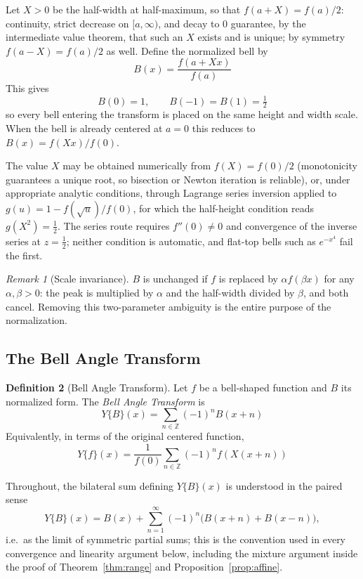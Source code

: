 \documentclass[11pt]{article}
\theoremstyle{definition}
\newtheorem{definition}{Definition}[section]
\theoremstyle{plain}
\theoremstyle{remark}
\newtheorem{remark}[definition]{Remark}
\begin{document}
Let $X>0$ be the half-width at half-maximum, so that $f(a+X)=f(a)/2$: continuity,
strict decrease on $[a,\infty)$, and decay to $0$ guarantee, by the intermediate value
theorem, that such an $X$ exists and is unique; by symmetry
$f(a-X)=f(a)/2$ as well. Define the normalized bell by
\[
\boxed{\;B(x)=\frac{f(a+Xx)}{f(a)}\;}
\]
This gives
\[
\boxed{\;B(0)=1,\qquad B(-1)=B(1)=\tfrac12 \;}
\]
so every bell entering the transform is placed on the same height and width scale. When
the bell is already centered at $a=0$ this reduces to $B(x)=f(Xx)/f(0)$.

The value $X$ may be obtained numerically from $f(X)=f(0)/2$ (monotonicity guarantees
a unique root, so bisection or Newton iteration is reliable), or, under appropriate
analytic conditions, through Lagrange series inversion applied to
$g(u)=1-f(\sqrt u)/f(0)$, for which the half-height condition reads $g(X^2)=\tfrac12$.
The series route requires $f''(0)\neq0$ and convergence of the inverse series at
$z=\tfrac12$; neither condition is automatic, and flat-top bells such as $e^{-x^4}$ fail
the first.

\begin{remark}[Scale invariance]
$B$ is unchanged if $f$ is replaced by $\alpha f(\beta x)$ for any $\alpha,\beta>0$: the
peak is multiplied by $\alpha$ and the half-width divided by $\beta$, and both cancel.
Removing this two-parameter ambiguity is the entire purpose of the normalization.
\end{remark}

\subsection{The Bell Angle Transform}

\begin{definition}[Bell Angle Transform]\label{def:bell-angle-transform}
Let $f$ be a bell-shaped function and $B$ its normalized form. The \emph{Bell Angle
Transform} is
\[
\boxed{\;Y\{B\}(x)=\sum_{n\in\mathbb{Z}}(-1)^n B(x+n)\;}
\]
Equivalently, in terms of the original centered function,
\[
\boxed{\;Y\{f\}(x)=\frac{1}{f(0)}\sum_{n\in\mathbb{Z}}(-1)^n f\!\left(X(x+n)\right)\;}
\]
\end{definition}

Throughout, the bilateral sum defining $Y\{B\}(x)$ is understood in the paired sense
\[
Y\{B\}(x) = B(x) + \sum_{n=1}^{\infty}(-1)^n\bigl(B(x+n)+B(x-n)\bigr),
\]
i.e.\ as the limit of symmetric partial sums; this is the convention used in every
convergence and linearity argument below, including the mixture argument inside the
proof of Theorem~\ref{thm:range} and Proposition~\ref{prop:affine}.
\end{document}
